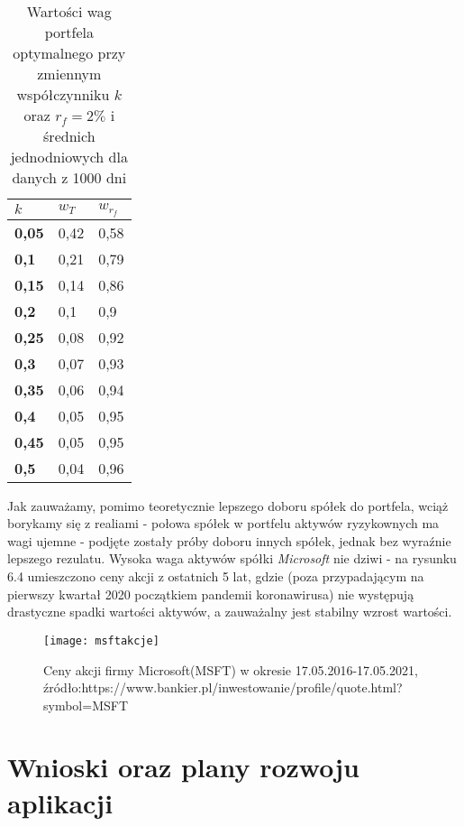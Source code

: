 \documentclass[magister]{dyplom}
\begin{document}
\begin{table}[ht]
	\centering
	\caption{Wartości wag portfela optymalnego przy zmiennym współczynniku $k$ oraz $r_f = 2\%$ i średnich jednodniowych dla danych z 1000 dni}
	\begin{tabular}{|l|l|l|}
		\hline
		\textbf{$k$} & \textbf{$w_T$} & \textbf{$w_{r_f}$} \\ \hline
		\textbf{0,05} & 0,42          & 0,58           \\ \hline
		\textbf{0,1}  & 0,21          & 0,79           \\ \hline
		\textbf{0,15} & 0,14          & 0,86           \\ \hline
		\textbf{0,2}  & 0,1           & 0,9            \\ \hline
		\textbf{0,25} & 0,08          & 0,92           \\ \hline
		\textbf{0,3}  & 0,07          & 0,93           \\ \hline
		\textbf{0,35} & 0,06          & 0,94           \\ \hline
		\textbf{0,4}  & 0,05          & 0,95           \\ \hline
		\textbf{0,45} & 0,05          & 0,95           \\ \hline
		\textbf{0,5}  & 0,04          & 0,96           \\ \hline
	\end{tabular}
\end{table}

Jak zauważamy, pomimo teoretycznie lepszego doboru spółek do portfela, wciąż borykamy się z realiami - połowa spółek w portfelu aktywów ryzykownych ma wagi ujemne - podjęte zostały próby doboru innych spółek, jednak bez wyraźnie lepszego rezulatu. Wysoka waga aktywów spółki \textit{Microsoft} nie dziwi - na rysunku 6.4 umieszczono ceny akcji z ostatnich 5 lat, gdzie (poza przypadającym na pierwszy kwartał 2020 początkiem pandemii koronawirusa) nie występują drastyczne spadki wartości aktywów, a zauważalny jest stabilny wzrost wartości.

\begin{figure}[ht]
	\centering
	\texttt{[image: msftakcje]}
	\caption{Ceny akcji firmy Microsoft(MSFT) w okresie 17.05.2016-17.05.2021,\newline
		źródło:https://www.bankier.pl/inwestowanie/profile/quote.html?symbol=MSFT}
\end{figure}


\chapter{Wnioski oraz plany rozwoju aplikacji}
\end{document}
